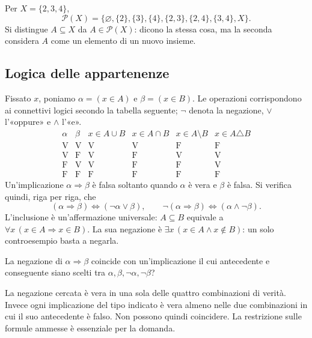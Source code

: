 \begin{esempio}
Per $X=\{2,3,4\}$,
\[
\mathcal P(X)=\{\varnothing,\{2\},\{3\},\{4\},\{2,3\},\{2,4\},\{3,4\},X\}.
\]
Si distingue $A\subseteq X$ da $A\in\mathcal P(X)$: dicono la stessa cosa, ma la seconda considera $A$ come un elemento di un nuovo insieme.
\end{esempio}

\begin{schema}
\end{schema}

\subsection{Logica delle appartenenze}
Fissato $x$, poniamo $\alpha=(x\in A)$ e $\beta=(x\in B)$. Le operazioni corrispondono ai connettivi logici secondo la tabella seguente; $\neg$ denota la negazione, $\lor$ l'«oppure» e $\land$ l'«e».
\[
\begin{array}{cc|cccc}
\alpha&\beta&x\in A\cup B&x\in A\cap B&x\in A\setminus B&x\in A\triangle B\\\hline
\mathrm V&\mathrm V&\mathrm V&\mathrm V&\mathrm F&\mathrm F\\
\mathrm V&\mathrm F&\mathrm V&\mathrm F&\mathrm V&\mathrm V\\
\mathrm F&\mathrm V&\mathrm V&\mathrm F&\mathrm F&\mathrm V\\
\mathrm F&\mathrm F&\mathrm F&\mathrm F&\mathrm F&\mathrm F
\end{array}
\]
Un'implicazione $\alpha\Rightarrow\beta$ è falsa soltanto quando $\alpha$ è vera e $\beta$ è falsa. Si verifica quindi, riga per riga, che
\[
(\alpha\Rightarrow\beta)\iff(\neg\alpha\lor\beta),\qquad
\neg(\alpha\Rightarrow\beta)\iff(\alpha\land\neg\beta).
\]
L'inclusione è un'affermazione universale: $A\subseteq B$ equivale a $\forall x\,(x\in A\Rightarrow x\in B)$. La sua negazione è $\exists x\,(x\in A\land x\notin B)$: un solo controesempio basta a negarla.

\begin{esercizio}
La negazione di $\alpha\Rightarrow\beta$ coincide con un'implicazione il cui antecedente e conseguente siano scelti tra $\alpha,\beta,\neg\alpha,\neg\beta$?
\end{esercizio}
\begin{svolgimento}
La negazione cercata è vera in una sola delle quattro combinazioni di verità. Invece ogni implicazione del tipo indicato è vera almeno nelle due combinazioni in cui il suo antecedente è falso. Non possono quindi coincidere. La restrizione sulle formule ammesse è essenziale per la domanda.
\end{svolgimento}

